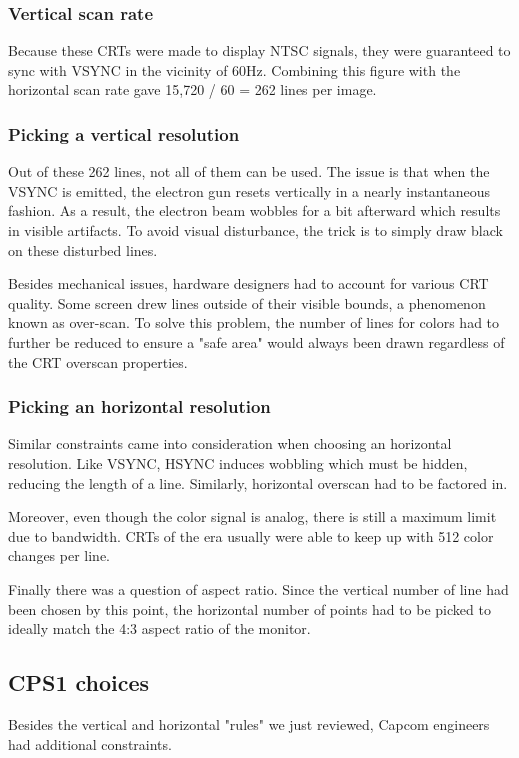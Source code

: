 \subsubsection{Vertical scan rate}
Because these CRTs were made to display NTSC signals, they were guaranteed to sync with VSYNC in the vicinity of 60Hz. Combining this figure with the horizontal scan rate gave 15,720 / 60 = 262 lines per image.


\subsubsection{Picking a vertical resolution}
Out of these 262 lines, not all of them can be used. The issue is that when the VSYNC is emitted, the electron gun resets vertically in a nearly instantaneous fashion. As a result, the electron beam wobbles for a bit afterward which results in visible artifacts. To avoid visual disturbance, the trick is to simply draw black on these disturbed lines. 

Besides mechanical issues, hardware designers had to account for various CRT quality. Some screen drew lines outside of their visible bounds, a phenomenon known as over-scan. To solve this problem, the number of lines for colors had to further be reduced to ensure a "safe area" would always been drawn regardless of the CRT overscan properties.



\subsubsection{Picking an horizontal resolution}
Similar constraints came into consideration when choosing an horizontal resolution. Like VSYNC, HSYNC induces wobbling which must be hidden, reducing the length of a line. Similarly, horizontal overscan had to be factored in.

Moreover, even though the color signal is analog, there is still a maximum limit due to bandwidth. CRTs of the era usually were able to keep up with 512 color changes per line.

Finally there was a question of aspect ratio. Since the vertical number of line had been chosen by this point, the horizontal number of points had to be picked to ideally match the 4:3 aspect ratio of the monitor.


\subsection{CPS1 choices}
Besides the vertical and horizontal "rules" we just reviewed, Capcom engineers had additional constraints.

